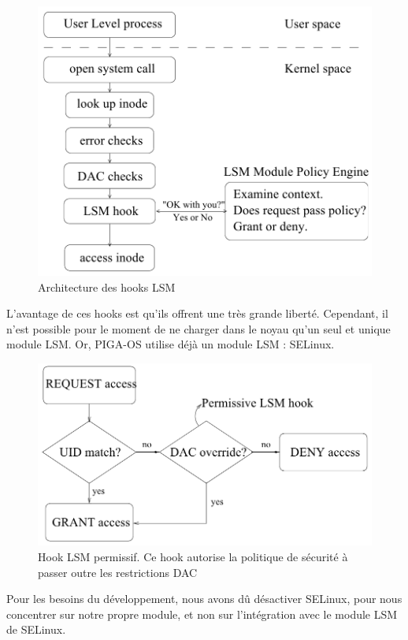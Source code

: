 \documentclass[pdftex,a4paper,titlepage,11pt]{article}
\begin{document}
\begin{figure}[!ht]
	\centering
	\includegraphics[scale=0.45]{attachements/lsm1.png}
	\caption{Architecture des hooks LSM \cite{LSMINTRO}}
\end{figure}

L'avantage de ces hooks est qu'ils offrent une très grande liberté. Cependant, il n'est possible pour le moment de ne charger dans le noyau qu'un seul et unique module LSM. Or, PIGA-OS utilise déjà un module LSM : SELinux.

\begin{figure}[!ht]
	\centering
	\includegraphics[scale=0.45]{attachements/lsm2.png}
	\caption{Hook LSM permissif. Ce hook autorise la politique de sécurité à passer outre les restrictions DAC \cite{LSMINTRO}}
\end{figure}

Pour les besoins du développement, nous avons dû désactiver SELinux, pour nous concentrer sur notre propre module, et non sur l'intégration avec le module LSM de SELinux.
\end{document}
